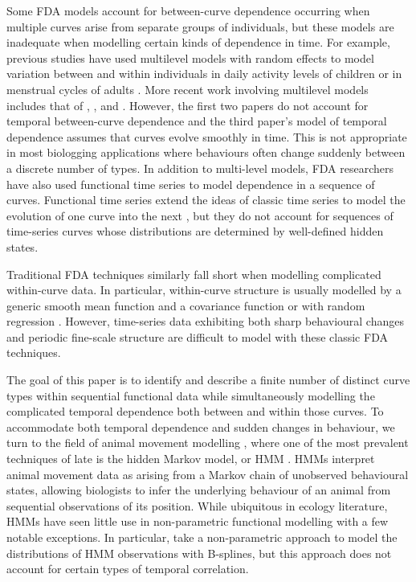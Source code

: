Some FDA models account for between-curve dependence occurring when multiple curves arise from separate groups of individuals, but these models are inadequate when modelling certain kinds of dependence in time. For example, previous studies have used multilevel models with random effects to model variation between and within individuals in daily activity levels of children \citep{Morris:2007} or in menstrual cycles of adults \citep{Bromback:1998}. More recent work involving multilevel models includes that of \citet{Di:2009}, \citet{Crainiceanu:2009}, and \citet{Chen:2012}. %
However, the first two papers do not account for temporal between-curve dependence and the third paper's model of temporal dependence assumes that curves evolve smoothly in time. This is not appropriate in most biologging applications where behaviours often change suddenly between a discrete number of types.
In addition to multi-level models, FDA researchers have also used functional time series to model dependence in a sequence of curves. Functional time series extend the ideas of classic time series to model the evolution of one curve into the next \citep{Kokoszka:2018}, but they do not account for sequences of time-series curves whose distributions are determined by well-defined hidden states.

Traditional FDA techniques similarly fall short when modelling complicated within-curve data. In particular, within-curve structure is usually modelled by a generic smooth mean function and a covariance function \citep{Yao:2005} or with random regression \citep{Rice:2001}. However, time-series data exhibiting both sharp behavioural changes and periodic fine-scale structure are difficult to model with these classic FDA techniques.

The goal of this paper is to identify and describe a finite number of distinct curve types within sequential functional data while simultaneously modelling the complicated temporal dependence both between and within those curves. To accommodate both temporal dependence and sudden changes in behaviour, we turn to the field of animal movement modelling \citep{Hooten:2017}, where one of the most prevalent techniques of late is the hidden Markov model, or HMM \citep{Patterson:2017,McClintock:2020}. HMMs interpret animal movement data as arising from a Markov chain of unobserved behavioural states, allowing biologists to infer the underlying behaviour of an animal from sequential observations of its position. While ubiquitous in ecology literature, HMMs have seen little use in non-parametric functional modelling with a few notable exceptions. In particular, \citet{Langrock:2018} take a non-parametric approach to model the distributions of HMM observations with B-splines, but this approach does not account for certain types of temporal correlation.


